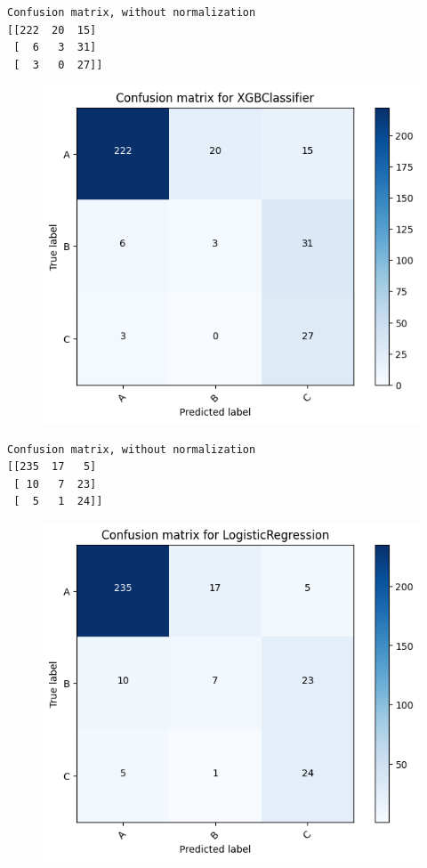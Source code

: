 \documentclass[
  letterpaper,
  DIV=11,
  numbers=noendperiod]{scrartcl}
\begin{document}
\begin{verbatim}
Confusion matrix, without normalization
[[222  20  15]
 [  6   3  31]
 [  3   0  27]]
\end{verbatim}

\begin{figure}[H]

{\centering \includegraphics{transformer-paper4_files/figure-pdf/cell-13-output-4.png}

}

\end{figure}

\begin{verbatim}
Confusion matrix, without normalization
[[235  17   5]
 [ 10   7  23]
 [  5   1  24]]
\end{verbatim}

\begin{figure}[H]

{\centering \includegraphics{transformer-paper4_files/figure-pdf/cell-13-output-6.png}

}

\end{figure}
\end{document}
